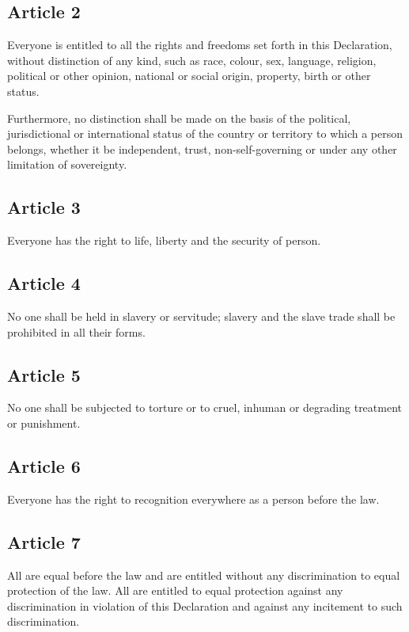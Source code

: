 \documentclass[
  titlepage,
  openright,
  DIV=calc,
  toc=listof,
  listof=nochaptergap]{scrbook}
\begin{document}
\subsection{Article 2}\label{article-2-1}

Everyone is entitled to all the rights and freedoms set forth in this
Declaration, without distinction of any kind, such as race, colour, sex,
language, religion, political or other opinion, national or social
origin, property, birth or other status.

Furthermore, no distinction shall be made on the basis of the political,
jurisdictional or international status of the country or territory to
which a person belongs, whether it be independent, trust,
non-self-governing or under any other limitation of sovereignty.

\subsection{Article 3}\label{article-3-1}

Everyone has the right to life, liberty and the security of person.

\subsection{Article 4}\label{article-4-1}

No one shall be held in slavery or servitude; slavery and the slave
trade shall be prohibited in all their forms.

\subsection{Article 5}\label{article-5-1}

No one shall be subjected to torture or to cruel, inhuman or degrading
treatment or punishment.

\subsection{Article 6}\label{article-6-1}

Everyone has the right to recognition everywhere as a person before the
law.

\subsection{Article 7}\label{article-7-1}

All are equal before the law and are entitled without any discrimination
to equal protection of the law. All are entitled to equal protection
against any discrimination in violation of this Declaration and against
any incitement to such discrimination.
\end{document}

